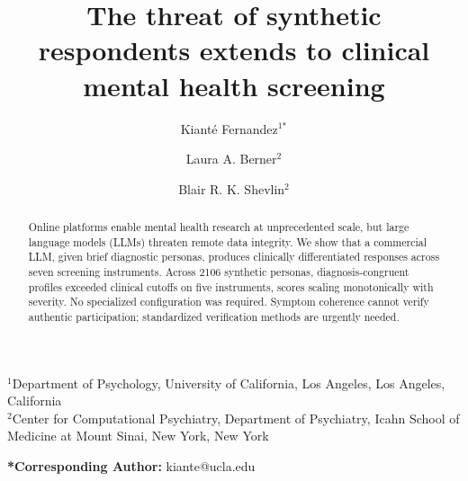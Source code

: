 \documentclass[10pt]{article}
\title{The threat of synthetic respondents extends to clinical mental health screening}
\author{%
  Kiant\'{e} Fernandez$^{1\textbf{*}}$ \and Laura A. Berner$^{2}$ \and Blair R. K. Shevlin$^{2}$
}
\date{}
\begin{document}
\maketitle

\begin{center}
  $^{1}$Department of Psychology, University of California, Los Angeles, Los Angeles, California \\
  $^{2}$Center for Computational Psychiatry, Department of Psychiatry, Icahn School of Medicine at Mount Sinai, New York, New York \\
\end{center}

\vspace{1em}
\textbf{*Corresponding Author:} kiante@ucla.edu

\begin{abstract}
Online platforms enable mental health research at unprecedented scale, but large language models (LLMs) threaten remote data integrity. We show that a commercial LLM, given brief diagnostic personas, produces clinically differentiated responses across seven screening instruments. Across 2106 synthetic personas, diagnosis-congruent profiles exceeded clinical cutoffs on five instruments, scores scaling monotonically with severity. No specialized configuration was required. Symptom coherence cannot verify authentic participation; standardized verification methods are urgently needed.
\end{abstract}
\end{document}

